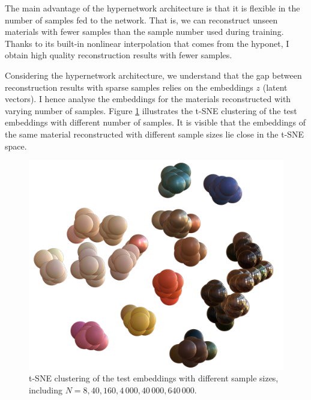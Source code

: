 The main advantage of the hypernetwork architecture is that it is flexible in the number of samples fed to the network. That is, we can reconstruct unseen materials with fewer samples than the sample number used during training. Thanks to its built-in nonlinear interpolation that comes from the hyponet, I obtain high quality reconstruction results with fewer samples. 

Considering the hypernetwork architecture, we understand that the gap between reconstruction results with sparse samples relies on the embeddings $z$ (latent vectors). I hence analyse the embeddings for the materials reconstructed with varying number of samples. Figure \ref{fig:tsne-vis-imputation} illustrates the t-SNE clustering of the test embeddings with different number of samples. It is visible that the embeddings of the same material reconstructed with different sample sizes lie close in the t-SNE space.

\begin{figure}[t]
  \centering
   \includegraphics[width=0.8\linewidth]{Chapters/hyperbrdf-figs/tsne6_2_den1-cropped-compressed.pdf}
   \caption{t-SNE clustering of the test embeddings with different sample sizes, including $N=8, 40, 160, 4\,000, 40\,000, 640\,000$.}

   \label{fig:tsne-vis-imputation}
\end{figure}


